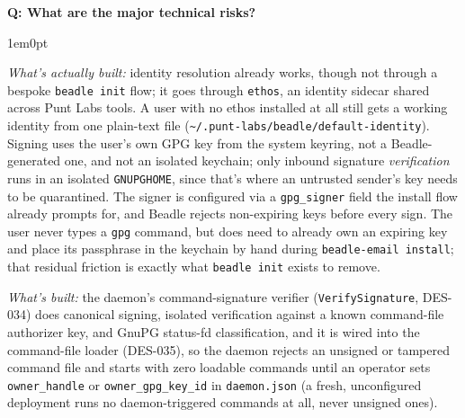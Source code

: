 \documentclass[11pt,letterpaper]{article}
\newcounter{faqnum}
\newenvironment{faqpair}[1]{%
  \needspace{4\baselineskip}%
  \vspace{0.5em}%
  \refstepcounter{faqnum}%
  \noindent\textbf{\color{SectionBlue}Q\thefaqnum: #1}\par\nopagebreak[4]%
  \vspace{0.2em}%
  \begin{adjustwidth}{1em}{0pt}%
  \setlength{\parindent}{0pt}%
}{%
  \end{adjustwidth}%
  \vspace{0.5em}%
}
\begin{document}
\begin{faqpair}{What are the major technical risks?}
\begin{enumerate}[nosep]
      \textit{What's actually built:} identity resolution already works,
      though not through a bespoke {\small\texttt{beadle init}} flow; it
      goes through \texttt{ethos}, an identity sidecar shared across Punt
      Labs tools. A user with no ethos installed at all still gets a working
      identity from one plain-text file
      ({\small\texttt{\textasciitilde/.punt-labs/beadle/default-identity}}).
      Signing uses the user's own GPG key from the system keyring,
      not a Beadle-generated one, and not an isolated keychain; only
      inbound signature \textit{verification} runs in an isolated
      {\small\texttt{GNUPGHOME}}, since that's where an untrusted
      sender's key needs to be quarantined. The signer is configured via
      a {\small\texttt{gpg\_signer}} field the install flow already
      prompts for, and Beadle rejects non-expiring keys before every
      sign. The user never types a \texttt{gpg} command, but does need
      to already own an expiring key and place its passphrase in the
      keychain by hand during {\small\texttt{beadle-email install}}; that
      residual friction is exactly what {\small\texttt{beadle init}}
      exists to remove.

      \textit{What's built:} the daemon's command-signature verifier
      ({\small\texttt{VerifySignature}}, DES-034) does canonical signing,
      isolated verification against a known command-file authorizer key, and
      GnuPG status-fd classification, and it is wired into the command-file
      loader (DES-035), so the daemon rejects an unsigned or tampered command
      file and starts with zero loadable commands until an operator sets
      {\small\texttt{owner\_handle}} or {\small\texttt{owner\_gpg\_key\_id}}
      in {\small\texttt{daemon.json}} (a fresh, unconfigured deployment runs
      no daemon-triggered commands at all, never unsigned ones).


\end{enumerate}
\end{faqpair}
\end{document}
